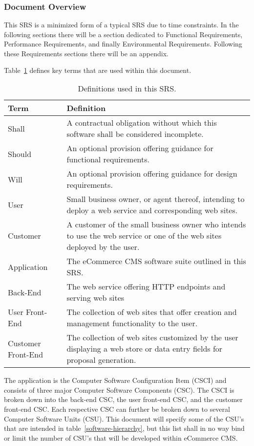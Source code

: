 \documentclass{article}
\begin{document}
\subsubsection{Document Overview}

This SRS is a minimized form of a typical SRS due to time constraints.  In the
following sections there will be a section dedicated to Functional Requirements,
Performance Requirements, and finally Environmental Requirements.  Following these
Requirements sections there will be an appendix.

Table~\ref{terms} defines key terms that are used within this document.

\begin{table}
\begin{tabular}{|l|p{11cm}|}\hline
Term & Definition \\\hline\hline
Shall & A contractual obligation without which this software shall be considered incomplete. \\\hline
Should & An optional provision offering guidance for functional requirements. \\\hline
Will & An optional provision offering guidance for design requirements. \\\hline
User & Small business owner, or agent thereof, intending to deploy a web service
and corresponding web sites. \\\hline
Customer & A customer of the small business owner who intends to use the web service
or one of the web sites deployed by the user. \\\hline
Application & The eCommerce CMS software suite outlined in this SRS. \\\hline
Back-End & The web service offering HTTP endpoints and serving web sites \\\hline
User Front-End & The collection of web sites that offer creation and management
functionality to the user. \\\hline
Customer Front-End & The collection of web sites customized by the user displaying
a web store or data entry fields for proposal generation.\\\hline
\end{tabular}
\caption{Definitions used in this SRS.}
\label{terms}
\end{table}

The application is the Computer Software Configuration Item (CSCI) and consists
of three major Computer Software Components (CSC).  The CSCI is broken down
into the back-end CSC, the user front-end CSC, and the customer front-end
CSC.  Each respective CSC can further be broken down to several Computer
Software Units (CSU).  This document will specify some of the CSU's that are
intended in table~\ref{software-hierarchy}, but this list shall in no way bind
or limit the number of CSU's that will be developed within eCommerce CMS.
\end{document}
